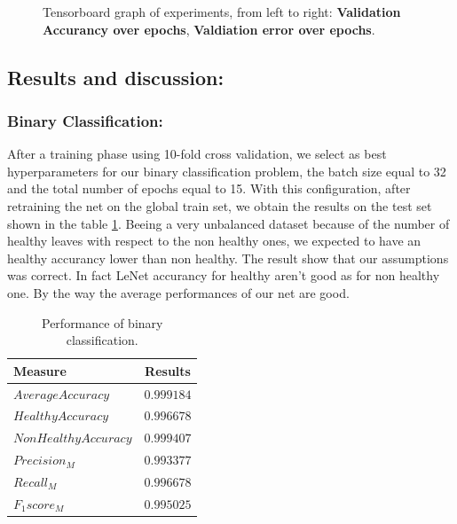 \begin{figure}
\begin{center}
	\begin{center}
		\caption{Tensorboard graph of experiments, from left to right: \textbf{Validation Accurancy over epochs}, \textbf{Valdiation error over epochs}. }
		\label{fig:tensorboard}
	\end{center}
	\vspace{-15pt}
\end{center}
\end{figure}

\subsection{Results and discussion:}
\subsubsection{Binary Classification:}
After a training phase using 10-fold cross validation, we select as best hyperparameters for our binary classification problem, the batch size equal to 32 and the total number of epochs equal to 15. With this configuration, after retraining the net on the global train set, we obtain the results on the test set shown in the table \ref{table:binary}. Beeing a very unbalanced dataset because of the number of healthy leaves with respect to the non healthy ones, we expected to have an healthy accurancy lower than non healthy. The result show that our assumptions was correct. In fact LeNet accurancy for healthy aren't good as for non healthy one. By the way the average performances of our net are good.
\begin{table}[H]
	\begin{center}
		\begin{tabular}{|l|c|}
			\hline
			\textbf{Measure} & \textbf{Results} \\ 
			\hline
			$Average Accuracy$ & $0.999184$ \\
			$Healthy Accuracy$ & $0.996678$ \\
			$Non Healthy Accuracy$ & $0.999407$ \\
			$Precision_M$ & $0.993377$ \\
			$Recall_M$ & $0.996678$ \\
			$F_1 score_M$ & $0.995025$ \\
			\hline
		\end{tabular}
	\end{center}
	\caption{Performance of binary classification.}
	\label{table:binary}
\end{table}
